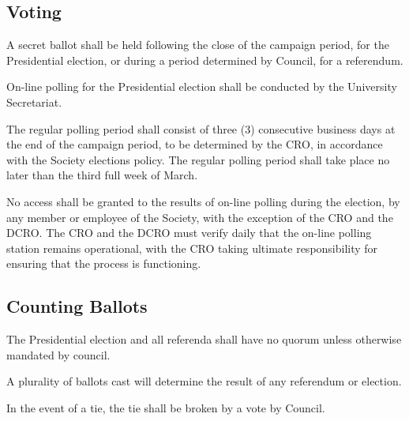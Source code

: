 \subsection{Voting}
\begin{longenum}[ label*=\thesubsection.\arabic*., align=left]
	\item A secret ballot shall be held following the close of the campaign period, for the Presidential election, or during a period determined by Council, for a referendum.
	\begin{longenum}[ label*=\arabic*., align=left]
		\item On-line polling for the Presidential election shall be conducted by the University Secretariat.
		 	\end{longenum}
    \item The regular polling period shall consist of three (3) consecutive business days at the end of the campaign period, to be determined by the CRO, in accordance with the Society elections policy. The regular polling period shall take place no later than the third full week of March.
   
    \item No access shall be granted to the results of on-line polling during the election, by any member or employee of the Society, with the exception of the CRO and the DCRO. The CRO and the DCRO must verify daily that the on-line polling station remains operational, with the CRO taking ultimate responsibility for ensuring that the process is functioning.
\end{longenum}
\subsection{Counting Ballots}

\begin{longenum}[ label*=\thesubsection.\arabic*., align=left]
	\item The Presidential election and all referenda shall have no quorum unless otherwise mandated by council.
    \item A plurality of ballots cast will determine the result of any referendum or election.
    \item In the event of a tie, the tie shall be broken by a vote by Council.
\end{longenum}

